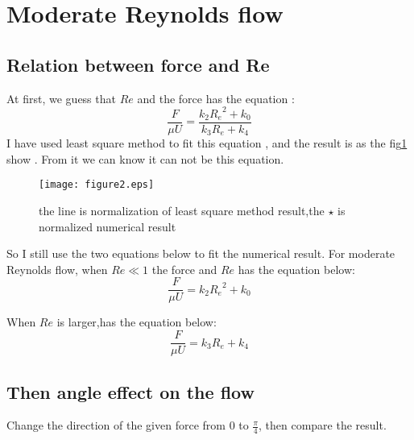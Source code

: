 \documentclass{article}
\begin{document}
\section{\label{sec:level1}Moderate Reynolds flow}
\subsection{\label{sec:level1}Relation between force and Re}
At first, we guess that $Re$ and the force has the equation :
     \begin{equation}
         \frac{F}{\mu U}=\frac{k_2{R_e}^2+k_0}{k_3{R_e}+k_4}
     \end{equation}
I have used least square method to fit this equation , and the result is as the fig\ref{Fig.lable2} show . From it we can know it can not be this equation.
\begin{figure}[tb]
  \centering
  \texttt{[image: figure2.eps]}\\
  \caption{the line is normalization of least square method result,the $\star$ is normalized numerical result}\label{Fig.lable2}
\end{figure}


So I still  use the two equations below to fit the numerical result.
For moderate Reynolds flow, when $Re\ll1$ the force and $Re$ has the equation below:
     \begin{equation}
         \frac{F}{\mu U}=k_2{R_e}^2+k_0
     \end{equation}


When $Re$ is larger,has the equation below:
     \begin{equation}
         \frac{F}{\mu U}= k_3{R_e}+k_4
     \end{equation}
\subsection{\label{sec:level1}Then angle effect on the flow}
Change the direction of the given force from $0$ to $\frac{\pi}{4}$, then compare the result.
\end{document}
